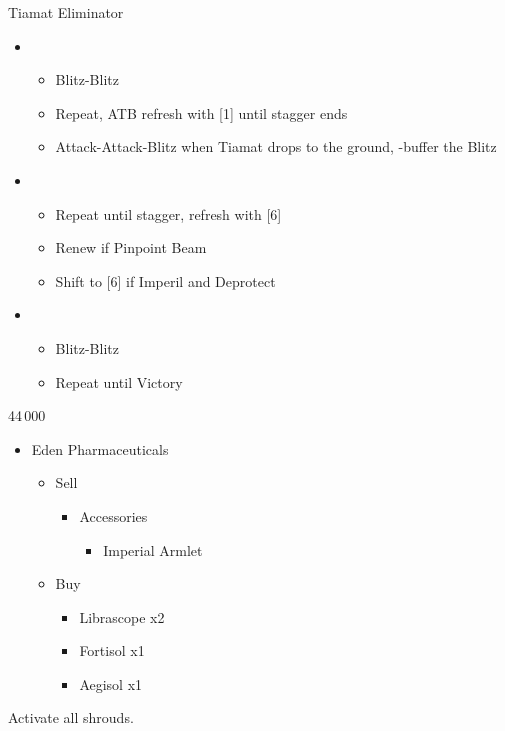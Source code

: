 \begin{multicols}{2}
\begin{battle}{Tiamat Eliminator}
\begin{itemize}
\begin{itemize}
    \end{itemize}
    \item \second
    \begin{itemize}
        \item Blitz-Blitz
        \item Repeat, ATB refresh with [1] until stagger ends
        \item Attack-Attack-Blitz when Tiamat drops to the ground, \rav-buffer the Blitz
    \end{itemize}
    \item \fifth
    \begin{itemize}
        \item Repeat until stagger, refresh with [6]
        \item Renew if Pinpoint Beam
        \item Shift to [6] if Imperil and Deprotect
    \end{itemize}
    \item \second
    \begin{itemize}
        \item Blitz-Blitz
        \item Repeat until Victory
    \end{itemize}
\end{itemize}
\end{battle}

\begin{shop}{44\,000}
\begin{itemize}
    \item Eden Pharmaceuticals
    \begin{itemize}
        \item Sell
        \begin{itemize}
            \item Accessories
            \begin{itemize}
                \item Imperial Armlet
            \end{itemize}
        \end{itemize}
        \item Buy
        \begin{itemize}
            \item Librascope x2
            \item Fortisol x1
            \item Aegisol x1
        \end{itemize}
    \end{itemize}
\end{itemize}
\end{shop}
Activate all shrouds.
\end{multicols}
\renewcommand{\first}{[1] Tireless Charge ((\com)/\com/\med)}
\renewcommand{\second}{[2] Aggression (\com/\com/\rav)}
\renewcommand{\third}{[3] Consolidation (\sen/\sen/\med)}
\renewcommand{\fourth}{[4] Malevolence (\syn/(\rav)/\rav)}
\renewcommand{\fifth}{[5] Smart Bomb (\rav/\rav/\sab)}
\renewcommand{\sixth}{[6] Tri-Disaster (\rav/\rav/\rav)}

